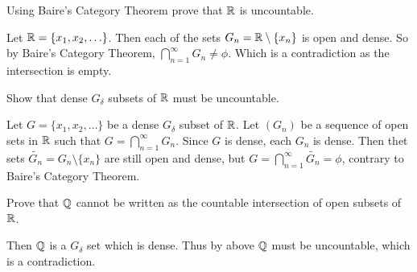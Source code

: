 \question Using Baire's Category Theorem prove that $\mathbb{R}$ is uncountable.
\begin{solution}
    Let $\mathbb{R}=\{x_1, x_2, \ldots\}$. Then each of the sets $G_n=\mathbb{R}\setminus\{x_n\}$ is open and dense. So by Baire's Category Theorem, $\displaystyle\bigcap_{n=1}^{\infty}{G_n}\neq\phi$. Which is a contradiction as the intersection is empty.
\end{solution}

\question Show that dense $G_{\delta}$ subsets of $\mathbb{R}$ must be uncountable.

\begin{solution}
    Let $G=\{x_1, x_2, \ldots\}$ be a dense $G_{\delta}$ subset of $\mathbb{R}$. Let $(G_n)$ be a sequence of open sets in $\mathbb{R}$ such that $G=\displaystyle\bigcap_{n=1}^{\infty}{G_n}$. Since $G$ is dense, each $G_n$ is dense. Then thet sets $\tilde{G_n}=G_n\setminus\{x_n\}$ are still open and dense, but $G=\displaystyle\bigcap_{n=1}^{\infty}{\tilde{G_n}}=\phi$, contrary to Baire's Category Theorem.
\end{solution}

\question Prove that $\mathbb{Q}$ cannot be written as the countable intersection of open subsets of $\mathbb{R}$.
\begin{solution}
    Then $\mathbb{Q}$ is a $G_{\delta}$ set which is dense. Thus by above $\mathbb{Q}$ must be uncountable, which is a contradiction.
\end{solution}